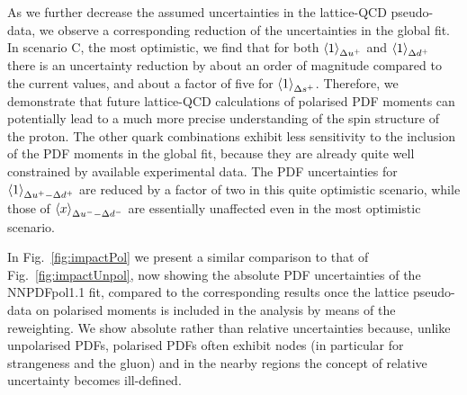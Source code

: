 As we further decrease the assumed uncertainties in the lattice-QCD
pseudo-data, we observe a corresponding reduction of the uncertainties
in the global fit.
%
In scenario C, the most optimistic, we find that for both
$\left\langle 1\right\rangle_{\Delta u^+}$ and $\left\langle 1\right\rangle_{\Delta d^+}$ there is an uncertainty
reduction by about an order of magnitude compared to the current values,
and about a factor of five for $\left\langle 1\right\rangle_{\Delta s^+}$.
%
Therefore, we demonstrate that future lattice-QCD calculations of
polarised PDF moments can potentially lead to a much more
precise understanding of the spin structure of the proton.
%
The other quark combinations exhibit less sensitivity to the inclusion
of the PDF moments in the global fit, because
they are already quite well constrained by available experimental
data.
%
The PDF uncertainties for  $\left\langle 1\right\rangle_{\Delta u^+ - \Delta d^+}$
are reduced by a factor of two in this quite optimistic scenario, while
those of $\left\langle x\right\rangle_{\Delta u^--\Delta d^-}$ are essentially unaffected even
in the most optimistic scenario.

%
In Fig.~\ref{fig:impactPol} we present a 
similar comparison to that of Fig.~\ref{fig:impactUnpol}, now
  showing the absolute PDF uncertainties of the NNPDFpol1.1 fit,
  compared to the corresponding results once the lattice pseudo-data
  on polarised moments is included in the analysis by means of the
  reweighting.
  We show absolute rather than relative uncertainties
  because, unlike unpolarised PDFs, polarised PDFs often exhibit nodes
  (in particular for strangeness and the gluon) and in the nearby regions
  the concept of relative uncertainty becomes ill-defined.
  
